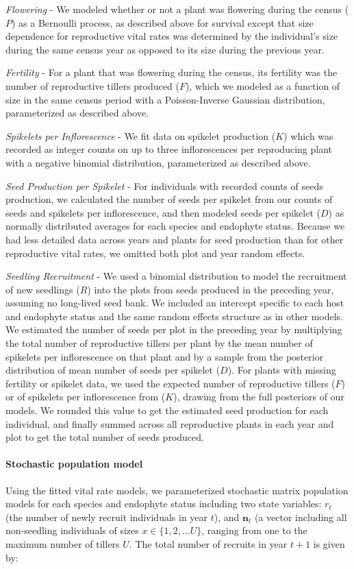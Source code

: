 \documentclass[12pt]{article}
\begin{document}
\emph{Flowering} - We modeled whether or not a plant was flowering during the census ($P$) as a Bernoulli process, as described above for survival except that size dependence for reproductive vital rates was determined by the individual's size during the same census year as opposed to its size during the previous year.

\emph{Fertility} - For a plant that was flowering during the census, its fertility was the number of reproductive tillers produced ($F$), which we modeled as a function of size in the same census period with a Poisson-Inverse Gaussian distribution, parameterized as described above. 

\emph{Spikelets per Inflorescence} - We fit data on spikelet production ($K$) which was recorded as integer counts on up to three inflorescences per reproducing plant with a negative binomial distribution, parameterized as described above. 

\emph{Seed Production per Spikelet} - For individuals with recorded counts of seeds production, we calculated the number of seeds per spikelet from our counts of seeds and spikelets per inflorescence, and then modeled seeds per spikelet ($D$) as normally distributed averages for each species and endophyte status. 
Because we had less detailed data across years and plants for seed production than for other reproductive vital rates, we omitted both plot and year random effects. 

\emph{Seedling Recruitment} - We used a binomial distribution to model the recruitment of new seedlings ($R$) into the plots from seeds produced in the preceding year, assuming no long-lived seed bank. 
We included an intercept specific to each host and endophyte status and the same random effects structure as in other models. 
We estimated the number of seeds per plot in the preceding year by multiplying the total number of reproductive tillers per plant by the mean number of spikelets per inflorescence on that plant and by a sample from the posterior distribution of mean number of seeds per spikelet ($D$).
For plants with missing fertility or spikelet data, we used the expected number of reproductive tillers ($F$) or of spikelets per inflorescence from ($K$), drawing from the full posteriors of our models. 
We rounded this value to get the estimated seed production for each individual, and finally summed across all reproductive plants in each year and plot to get the total number of seeds produced. 

\paragraph*{Stochastic population model}
Using the fitted vital rate models, we parameterized stochastic matrix population models for each species and endophyte status including two state variables: $r_{t}$ (the number of newly recruit individuals in year $t$), and $\textbf{n}_{t}$ (a vector including all non-seedling individuals of sizes $x\in\{1,2,...U\} $, ranging from one to the maximum number of tillers $U$. 
The total number of recruits in year $t+1$ is given by:
\end{document}
